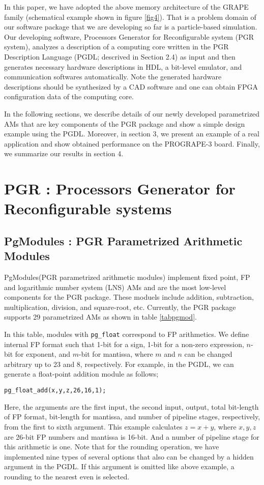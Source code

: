 \documentclass{llncs}
\begin{document}
In this paper, we have adopted the above memory
architecture of the GRAPE family (schematical example shown in figure \ref{fig4}).
That is a problem domain of our software package
that we are developing so far is a particle-based simulation.
Our developing software, 
Processors Generator for Reconfigurable system (PGR system),
analyzes a description of a computing core
written in the PGR Description Language (PGDL; descrived in Section 2.4)
as input and then generates necessary hardware descriptions in HDL,
a bit-level emulator, and communication softwares automatically.
Note the generated hardware descriptions should be synthesized by a CAD software
and one can obtain FPGA configuration data of the computing core. 

In the following sections, we describe details of our
newly developed parametrized AMs that are key components of the PGR package
and show a simple design example using the PGDL.
Moreover, in section 3, we present an example of a real application 
and show obtained performance on the PROGRAPE-3 board.
Finally, we summarize our results in section 4.
%
\section{PGR : Processors Generator for Reconfigurable systems}
\subsection{PgModules : PGR Parametrized Arithmetic Modules}

PgModules(PGR parametrized arithmetic modules) implement fixed point, 
FP and logarithmic number system (LNS) AMs and 
are the most low-level components for the PGR package.
These moduels include addition, subtraction, multiplication, division, and square-root, etc. 
Currently, the PGR package supports
29 parametrized AMs as shown in table \ref{tabpgmod}.

In this table, modules with {\tt pg\_float} correspond to FP arithmetics.
We define internal FP format such that 1-bit for a sign, 
1-bit for a non-zero expression, $n$-bit for exponent, 
and $m$-bit for mantissa, where $m$ and $n$ can be 
changed arbitrary up to 23 and 8, respectively.
For example, in the PGDL, we can generate a float-point addition module
as follows;
\begin{verbatim}
pg_float_add(x,y,z,26,16,1);
\end{verbatim}
Here, the arguments are the first input, the second input, output,
total bit-length of FP format, bit-length for mantissa,
and number of pipeline stages, respectively, from the first to sixth argument.
This example calculates
$z = x + y$, where $x,y,z$ are 26-bit FP numbers and mantissa is 16-bit.
And a number of pipeline stage for this arithmetic is one.
Note that for the rounding operation, we have implemented nine types
of several options that also can be changed by a hidden argument in the PGDL.
If this argument is omitted like above example, 
a rounding to the nearest even is selected.
\end{document}
